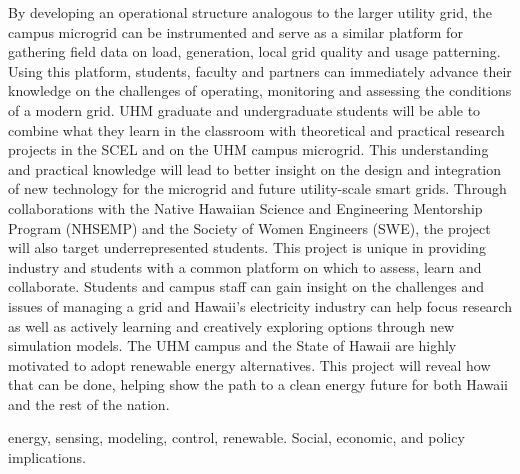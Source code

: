 \documentclass{proposalnsf}
\begin{document}
  By developing an operational structure analogous to the larger utility grid, the campus microgrid can be instrumented and serve as a similar platform for gathering field data on load, generation, local grid quality and usage patterning.  Using this platform, students, faculty and partners can immediately advance their knowledge on the challenges of operating, monitoring and assessing the conditions of a modern grid.  UHM graduate and undergraduate students will be able to combine what they learn in the classroom with theoretical and practical research projects in the SCEL and on the UHM campus microgrid. This understanding and practical knowledge will lead to better insight on the design and integration of new technology for the microgrid and future utility-scale smart grids.  Through collaborations with the Native Hawaiian Science and Engineering Mentorship Program (NHSEMP) and the Society of Women Engineers (SWE), the project will also target underrepresented students. This project is unique in providing industry and students with a common platform on which to assess, learn and collaborate.  Students and campus staff can gain insight on the challenges and issues of managing a grid and Hawaii's electricity industry can help focus research as well as actively learning and creatively exploring options through new simulation models.  The UHM campus and the State of Hawaii are highly motivated to adopt renewable energy alternatives.  This project will reveal how that can be done, helping show the path to a clean energy future for both Hawaii and the rest of the nation.

\medskip

 energy, sensing, modeling, control, renewable. Social, economic,
and policy implications.
\end{document}

